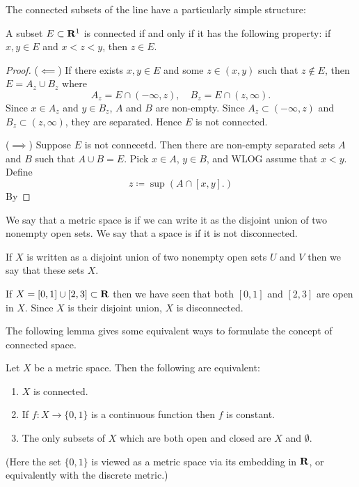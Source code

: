 The connected subsets of the line have a particularly simple structure: 

\begin{proposition}
A subset $E\subset\mathbf R^1$ is connected if and only if it has the following property: if $x,y\in E$ and $x<z<y$, then $z\in E$.
\end{proposition}

\begin{proof}
($\impliedby$) If there exists $x,y\in E$ and some $z\in(x,y)$ such that $z\notin E$, then $E=A_z\cup B_z$ where
\[ A_z=E\cap(-\infty,z), \quad B_z=E\cap(z,\infty). \]
Since $x\in A_z$ and $y\in B_z$, $A$ and $B$ are non-empty. Since $A_z\subset(-\infty,z)$ and $B_z\subset(z,\infty)$, they are separated. Hence $E$ is not connected.

($\implies$) Suppose $E$ is not connecetd. Then there are non-empty separated sets $A$ and $B$ such that $A\cup B=E$. Pick $x\in A$, $y\in B$, and WLOG assume that $x<y$. Define
\[z\coloneqq\sup(A\cap[x,y].)\]
By 
\end{proof}




\begin{definition}
We say that a metric space is  if we can write it as the disjoint union of two nonempty open sets. We say that a space is  if it is not disconnected.
\end{definition}

If $X$ is written as a disjoint union of two nonempty open sets $U$ and $V$ then we say that these sets  $X$.

\begin{example}
If $X=[0,1]\cup[2,3]\subset\mathbf R$ then we have seen that both $[0,1]$ and $[2,3]$ are open in $X$. Since $X$ is their disjoint union, $X$ is disconnected.
\end{example}

The following lemma gives some equivalent ways to formulate the concept of connected space.

\begin{lemma}
Let $X$ be a metric space. Then the following are equivalent:
\begin{enumerate}[label=(\arabic*)]
\item $X$ is connected.
\item If $f:X\to\{0,1\}$ is a continuous function then $f$ is constant.
\item The only subsets of $X$ which are both open and closed are $X$ and $\emptyset$.
\end{enumerate}
(Here the set $\{0,1\}$ is viewed as a metric space via its embedding in $\mathbf R$, or equivalently with the discrete metric.)
\end{lemma}

